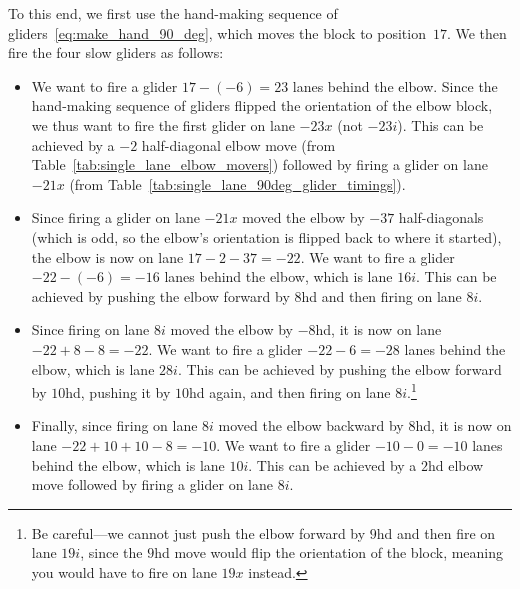 To this end, we first use the hand-making sequence of gliders~\eqref{eq:make_hand_90_deg}, which moves the block to position~$17$. We then fire the four slow gliders as follows:\smallskip

\begin{itemize}
	\item We want to fire a glider $17 - (-6) = 23$ lanes behind the elbow. Since the hand-making sequence of gliders flipped the orientation of the elbow block, we thus want to fire the first glider on lane $-23x$ (not $-23i$). This can be achieved by a $-2$ half-diagonal elbow move (from Table~\ref{tab:single_lane_elbow_movers}) followed by firing a glider on lane $-21x$ (from Table~\ref{tab:single_lane_90deg_glider_timings}).\smallskip
	
	\item Since firing a glider on lane $-21x$ moved the elbow by $-37$ half-diagonals (which is odd, so the elbow's orientation is flipped back to where it started), the elbow is now on lane $17 - 2 - 37 = -22$. We want to fire a glider $-22 - (-6) = -16$ lanes behind the elbow, which is lane $16i$. This can be achieved by pushing the elbow forward by $8$hd and then firing on lane $8i$.\smallskip
	
	\item Since firing on lane $8i$ moved the elbow by $-8$hd, it is now on lane $-22 + 8 - 8 = -22$. We want to fire a glider $-22 - 6 = -28$ lanes behind the elbow, which is lane $28i$. This can be achieved by pushing the elbow forward by $10$hd, pushing it by $10$hd again, and then firing on lane $8i$.\footnote{Be careful---we cannot just push the elbow forward by $9$hd and then fire on lane $19i$, since the $9$hd move would flip the orientation of the block, meaning you would have to fire on lane $19x$ instead.}\smallskip
	
	\item Finally, since firing on lane $8i$ moved the elbow backward by $8$hd, it is now on lane $-22 + 10 + 10 - 8 = -10$. We want to fire a glider $-10 - 0 = -10$ lanes behind the elbow, which is lane $10i$. This can be achieved by a $2$hd elbow move followed by firing a glider on lane $8i$.\smallskip
\end{itemize}

